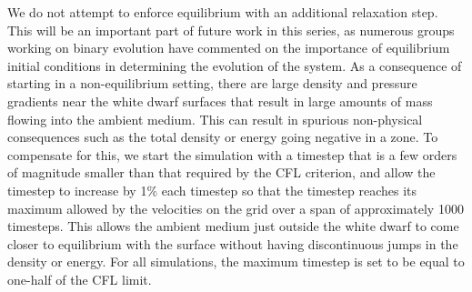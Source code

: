 \documentclass[iop]{emulateapj}
\begin{document}
We do not attempt to enforce equilibrium with an additional relaxation
step. This will be an important part of future work in this series, as
numerous groups working on binary evolution
\citep{swc:2000,motl:2002,rosswog:2004,dan:2011,pakmor:2012:gadget}
have commented on the importance of equilibrium initial conditions in
determining the evolution of the system. As a consequence of starting 
in a non-equilibrium setting, there are 
large density and pressure gradients near the white dwarf surfaces
that result in large amounts of mass flowing into the ambient
medium. This can result in spurious non-physical consequences such as 
the total density or energy going negative in a zone. To compensate 
for this, we start the simulation with a timestep that is a few orders 
of magnitude smaller than that required by the CFL criterion, and allow
the timestep to increase by 1\% each timestep so that the timestep reaches 
its maximum allowed by the velocities on the grid over a span of approximately 
1000 timesteps. This allows the ambient medium just outside the white dwarf
to come closer to equilibrium with the surface without having 
discontinuous jumps in the density or energy. For all simulations, 
the maximum timestep is set to be equal to one-half of the CFL limit.
\end{document}
